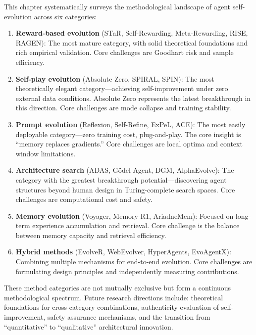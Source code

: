 This chapter systematically surveys the methodological landscape of agent self-evolution across six categories:

\begin{enumerate}
\item \textbf{Reward-based evolution} (STaR, Self-Rewarding, Meta-Rewarding, RISE, RAGEN): The most mature category, with solid theoretical foundations and rich empirical validation. Core challenges are Goodhart risk and sample efficiency.

\item \textbf{Self-play evolution} (Absolute Zero, SPIRAL, SPIN): The most theoretically elegant category---achieving self-improvement under zero external data conditions. Absolute Zero represents the latest breakthrough in this direction. Core challenges are mode collapse and training stability.

\item \textbf{Prompt evolution} (Reflexion, Self-Refine, ExPeL, ACE): The most easily deployable category---zero training cost, plug-and-play. The core insight is ``memory replaces gradients.'' Core challenges are local optima and context window limitations.

\item \textbf{Architecture search} (ADAS, G\"{o}del Agent, DGM, AlphaEvolve): The category with the greatest breakthrough potential---discovering agent structures beyond human design in Turing-complete search spaces. Core challenges are computational cost and safety.

\item \textbf{Memory evolution} (Voyager, Memory-R1, AriadneMem): Focused on long-term experience accumulation and retrieval. Core challenge is the balance between memory capacity and retrieval efficiency.

\item \textbf{Hybrid methods} (EvolveR, WebEvolver, HyperAgents, EvoAgentX): Combining multiple mechanisms for end-to-end evolution. Core challenges are formulating design principles and independently measuring contributions.
\end{enumerate}

These method categories are not mutually exclusive but form a continuous methodological spectrum. Future research directions include: theoretical foundations for cross-category combinations, authenticity evaluation of self-improvement, safety assurance mechanisms, and the transition from ``quantitative'' to ``qualitative'' architectural innovation.

